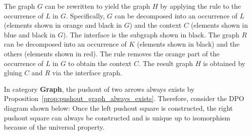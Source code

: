 The graph $G$ can be rewritten to yield the graph $H$ by applying the rule to the occurrence  of $L$ in $G$.
Specifically, $G$ can be decomposed into an occurrence of $L$ (elements shown in orange and black in $G$) and the context $C$ (elements shown in blue and black in $G$). The interface is the subgraph shown in black.
The graph $R$ can be decomposed into an occurrence of $K$ (elements shown in black) and the others (elements shown in red).
The rule removes the orange part of the occurrence of $L$ in $G$ to obtain the context $C$. 
The result graph $H$ is obtained by gluing $C$ and $R$ via the interface graph.


In category \textbf{Graph}, the pushout of two arrows always exists by Proposition~\ref{prop:pushout_graph_always_exists}. Therefore, consider the DPO diagram shown
below:
 Once the left pushout square is constructed, the right pushout square can always be constructed and is unique up to isomorphism because of the universal property.
\begin{center}
    \end{center}

